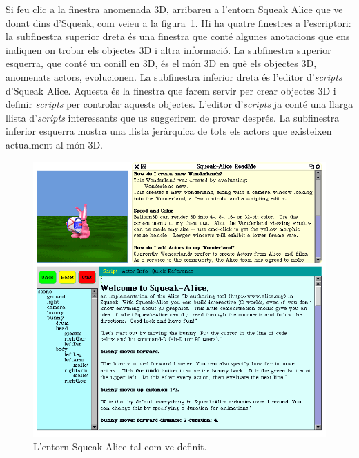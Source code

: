 Si feu clic a la finestra anomenada 3D, arribareu a l'entorn Squeak Alice que ve donat dins d'Squeak, com veieu a la figura~\ref{fig2502}. Hi ha quatre finestres a l'escriptori: la subfinestra superior dreta és una finestra que conté algunes anotacions que ens indiquen on trobar els objectes 3D i altra informació. La subfinestra superior esquerra, que conté un conill en 3D, és el món 3D en què els objectes 3D, anomenats actors, evolucionen. La subfinestra inferior dreta és l'editor d'\emph{scripts} d'Squeak Alice. Aquesta és la finestra que farem servir per crear objectes 3D i definir \emph{scripts} per controlar aquests objectes. L'editor d'\emph{scripts} ja conté una llarga llista d'\emph{scripts} interessants que us suggerirem de provar després. La subfinestra inferior esquerra mostra una llista jeràrquica de tots els actors que existeixen actualment al món 3D.
\begin{figure}[h!]
\begin{center}
\includegraphics[scale=0.5]{Imatges/figura25-2}
\end{center}
\caption{L'entorn Squeak Alice tal com ve definit.}
\label{fig2502}
\end{figure}

